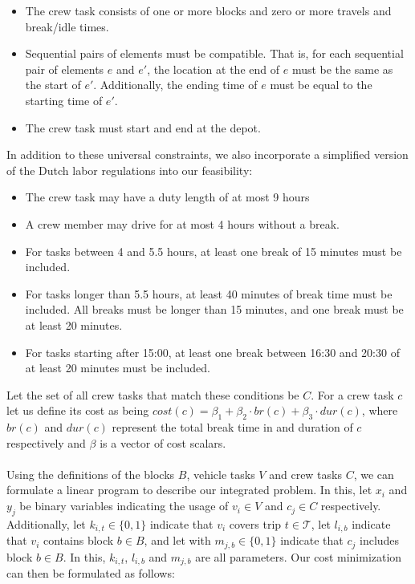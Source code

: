 \documentclass[]{article}
\begin{document}
\begin{itemize}
  \item The crew task consists of one or more blocks and zero or more travels and break/idle times.
  \item Sequential pairs of elements must be compatible. That is, for each sequential pair of elements $e$ and $e'$, the location at the end of $e$ must be the same as the start of $e'$. Additionally, the ending time of $e$ must be equal to the starting time of $e'$. 
  \item The crew task must start and end at the depot.
\end{itemize}
In addition to these universal constraints, we also incorporate a simplified version of the Dutch labor regulations into our feasibility: 
\begin{itemize}
  \item The crew task may have a duty length of at most 9 hours 
  \item A crew member may drive for at most 4 hours without a break.
  \item For tasks between 4 and 5.5 hours, at least one break of 15 minutes must be included. 
  \item For tasks longer than 5.5 hours, at least 40 minutes of break time must be included. All breaks must be longer than 15 minutes, and one break must be at least 20 minutes.
  \item For tasks starting after 15:00, at least one break between 16:30 and 20:30 of at least 20 minutes must be included. 
\end{itemize}
Let the set of all crew tasks that match these conditions be $C$. For a crew task $c$ let us define its cost as being $cost(c) = \beta_1 + \beta_2 \cdot br(c) + \beta_3 \cdot dur(c)$, where $br(c)$ and $dur(c)$ represent the total break time in and duration of $c$ respectively and $\beta$ is a vector of cost scalars. \\\\
Using the definitions of the blocks $B$, vehicle tasks $V$ and crew tasks $C$, we can formulate a linear program to describe our integrated problem. In this, let $x_i$ and $y_j$ be binary variables indicating the usage of $v_i \in V$ and $c_j \in C$ respectively. Additionally, let $k_{i,t} \in \{ 0, 1 \}$ indicate that $v_i$ covers trip $t \in \mathcal{T}$, let $l_{i,b}$ indicate that $v_i$ contains block $b \in B$, and let with $m_{j,b} \in \{ 0, 1 \} $ indicate that $c_j$ includes block $b \in B$. In this, $k_{i,t}$, $l_{i,b}$ and $m_{j,b}$ are all parameters. Our cost minimization can then be formulated as follows:
\end{document}
